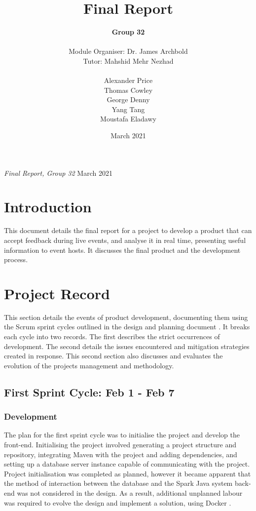 \documentclass[9pt, titlepage]{extarticle}
\title{Final Report}
\author{
\textbf{Group 32} \\\\
Module Organiser: Dr. James Archbold \\
Tutor: Mahshid Mehr Nezhad \\\\
Alexander Price \\
Thomas Cowley \\
George Denny \\
Yang Tang \\
Moustafa Eladawy
}
\date{March 2021}
\begin{document}
\Large{
\emph{Final Report, Group 32}
\hfill
March 2021}
\normalsize{}


\section{Introduction}
This document details the final report for a project to develop a product that can accept feedback during live events, and analyse it in real time, presenting useful information to event hosts. It discusses the final product and the development process.

\section{Project Record}

This section details the events of product development, documenting them using the Scrum sprint cycles outlined in the design and planning document \cite{design-and-planning}. It breaks each cycle into two records. The first describes the strict occurrences of development. The second details the issues encountered and mitigation strategies created in response. This second section also discusses and evaluates the evolution of the projects management and methodology.

\subsection{First Sprint Cycle: Feb 1 - Feb 7}

\subsubsection{Development}

The plan for the first sprint cycle was to initialise the project and develop the front-end. Initialising the project involved generating a project structure and repository, integrating Maven with the project and adding dependencies, and setting up a database server instance capable of communicating with the project.\\

Project initialisation was completed as planned, however it became apparent that the method of interaction between the database and the Spark Java system back-end \cite{web:spark} was not considered in the design. As a result, additional unplanned labour was required to evolve the design and implement a solution, using Docker \cite{docker}.\\
\end{document}
